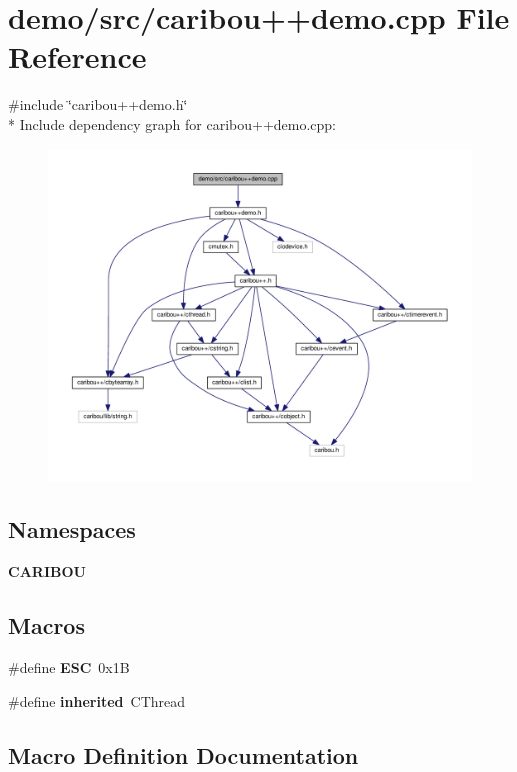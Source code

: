 \section{demo/src/caribou++demo.cpp File Reference}
\label{caribou_09_09demo_8cpp}
{\ttfamily \#include \char`\"{}caribou++demo.\+h\char`\"{}}\\*
Include dependency graph for caribou++demo.cpp\+:
\nopagebreak
\begin{figure}[H]
\begin{center}
\leavevmode
\includegraphics[width=350pt]{caribou_09_09demo_8cpp__incl}
\end{center}
\end{figure}
\subsection*{Namespaces}
\begin{DoxyCompactItemize}
\item 
 {\bf C\+A\+R\+I\+B\+OU}
\end{DoxyCompactItemize}
\subsection*{Macros}
\begin{DoxyCompactItemize}
\item 
\#define {\bf E\+SC}~0x1B
\item 
\#define {\bf inherited}~C\+Thread
\end{DoxyCompactItemize}


\subsection{Macro Definition Documentation}

